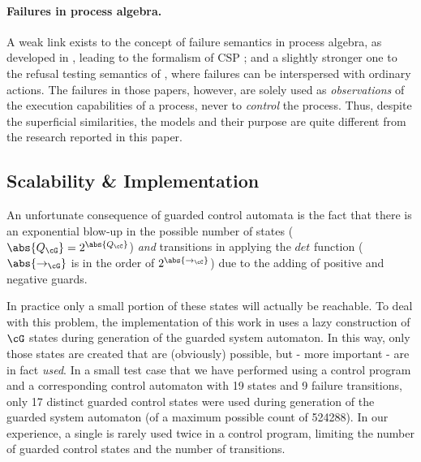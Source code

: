 
\paragraph{Failures in process algebra.}

A weak link exists to the concept of failure semantics in process algebra, as
developed in \cite{BrookesHoaRos1984}, leading to the formalism of CSP
\cite{Hoare1985}; and a slightly stronger one to the refusal testing semantics
of \cite{Phillips1986}, where failures can be interspersed with ordinary
actions. The failures in those papers, however, are solely used as
\emph{observations} of the execution capabilities of a process, never to
\emph{control} the process. Thus, despite the superficial similarities, the
models and their purpose are quite different from the research reported in this
paper.

\subsection{Scalability \& Implementation}
An unfortunate consequence of guarded control automata is the fact that there is an exponential blow-up in the possible number of states ($\abs{Q_{\cG}} = 2^{\abs{Q_{\cC}}}$) \emph{and} transitions in applying the $det$ function ($\abs{{\rightarrow}_\cG}$ is in the order of $2^{\abs{{\rightarrow}_\cC}}$) due to the adding of positive and negative guards.

In practice only a small portion of these states will actually be reachable. To deal with this problem, the implementation of this work in \cite{GROOVE} uses a lazy construction of $\cG$ states during generation of the guarded system automaton. In this way, only those states are created that are (obviously) possible, but - more important - are in fact \emph{used}. In a small test case that we have performed using a control program and a corresponding control automaton with 19 states and 9 failure transitions, only 17 distinct guarded control states were used during generation of the guarded system automaton (of a maximum possible count of 524288). In our experience, a single  is rarely used twice in a control program, limiting the number of guarded control states and the number of transitions.

